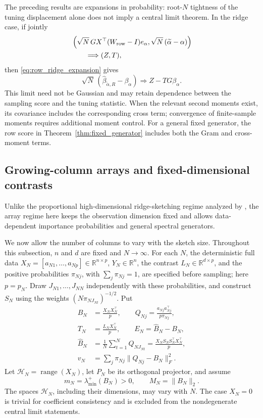 \documentclass[pdflatex,iicol,sn-mathphys-ay]{sn-jnl}
\theoremstyle{thmstyleone}
\theoremstyle{thmstylethree}
\theoremstyle{thmstyletwo}
\begin{document}
The preceding results are expansions in probability: root-$N$ tightness of
the tuning displacement alone does not imply a central limit theorem.
In the ridge case, if jointly
\[
 \begin{aligned}
 &\left(\sqrt N\,GX^\top(W_{\rm row}-I)e_\alpha,
       \sqrt N\,(\widetilde\alpha-\alpha)\right)\\
 &\qquad\Longrightarrow (Z,T),
 \end{aligned}
\]
then \eqref{eq:row_ridge_expansion} gives
\[
 \sqrt N\,(\widehat\beta_{\widetilde\alpha,R}-\beta_\alpha)
       \Longrightarrow Z-TG\beta_\alpha.
\]
This limit need not be Gaussian and may retain dependence between the
sampling score and the tuning statistic. When the relevant second moments
exist, its covariance includes the corresponding cross term; convergence
of finite-sample moments requires additional moment control.
For a general fixed generator, the row score in
Theorem~\ref{thm:fixed_generator} includes both the Gram and cross-moment terms.


\subsection{Growing-column arrays and fixed-dimensional contrasts}
\label{subsec:growing_column_arrays}

Unlike the proportional high-dimensional ridge-sketching regime analyzed
by \citet{liu2020ridge}, the array regime here keeps the
observation dimension fixed and allows data-dependent importance probabilities
and general spectral generators.

We now allow the number of columns to vary with the sketch size.
Throughout this subsection, \(n\) and \(d\) are fixed and \(N\to\infty\).
For each \(N\), the deterministic full data
\(X_N=[a_{N1},\ldots,a_{Np}]\in\mathbb R^{n\times p}\), \(Y_N\in\mathbb R^n\),
the contrast \(L_N\in\mathbb R^{d\times p}\), and the positive probabilities
\(\pi_{Nj}\), with \(\sum_j\pi_{Nj}=1\), are specified before sampling;
here \(p=p_N\). Draw \(J_{N1},\ldots,J_{NN}\) independently with these
probabilities, and construct \(S_N\) using the weights
\((N\pi_{NJ_{Nt}})^{-1/2}\). Put
\begin{align*}
 B_N&=\frac{X_NX_N^\top}{p},\qquad
 Q_{Nj}=\frac{a_{Nj}a_{Nj}^\top}{p\pi_{Nj}},\\
 T_N&=\frac{L_NX_N^\top}{p},\qquad E_N=\widehat B_N-B_N,\\
 \widehat B_N&=\frac1N\sum_{t=1}^NQ_{NJ_{Nt}}
             =\frac{X_NS_NS_N^\top X_N^\top}{p},\\
 v_N&=\sum_j\pi_{Nj}\|Q_{Nj}-B_N\|_F^2.
\end{align*}
Let \(\mathcal H_N=\operatorname{range}(X_N)\), let \(P_N\) be its
orthogonal projector, and assume
\[
 m_N=\lambda_{\min}^{+}(B_N)>0,\qquad M_N=\|B_N\|_2.
\]
The spaces \(\mathcal H_N\), including their dimensions, may vary with \(N\).
The case \(X_N=0\) is trivial for coefficient consistency and is excluded
from the nondegenerate central limit statements.
\end{document}
